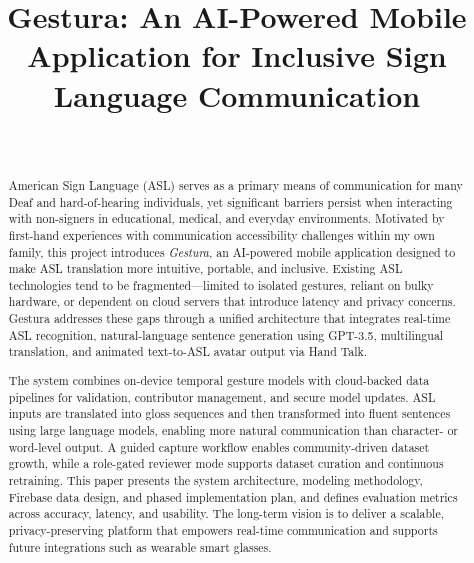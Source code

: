 \documentclass[conference]{IEEEtran}
\begin{document}
\title{Gestura: An AI-Powered Mobile Application for Inclusive Sign Language Communication}

\author{
\\
}

\maketitle

\begin{abstract}
American Sign Language (ASL) serves as a primary means of communication for many Deaf and hard-of-hearing individuals, yet significant barriers persist when interacting with non-signers in educational, medical, and everyday environments. Motivated by first-hand experiences with communication accessibility challenges within my own family, this project introduces \emph{Gestura}, an AI-powered mobile application designed to make ASL translation more intuitive, portable, and inclusive. Existing ASL technologies tend to be fragmented—limited to isolated gestures, reliant on bulky hardware, or dependent on cloud servers that introduce latency and privacy concerns. Gestura addresses these gaps through a unified architecture that integrates real-time ASL recognition, natural-language sentence generation using GPT-3.5, multilingual translation, and animated text-to-ASL avatar output via Hand Talk.

The system combines on-device temporal gesture models with cloud-backed data pipelines for validation, contributor management, and secure model updates. ASL inputs are translated into gloss sequences and then transformed into fluent sentences using large language models, enabling more natural communication than character- or word-level output. A guided capture workflow enables community-driven dataset growth, while a role-gated reviewer mode supports dataset curation and continuous retraining. This paper presents the system architecture, modeling methodology, Firebase data design, and phased implementation plan, and defines evaluation metrics across accuracy, latency, and usability. The long-term vision is to deliver a scalable, privacy-preserving platform that empowers real-time communication and supports future integrations such as wearable smart glasses.
\end{abstract}
\end{document}
